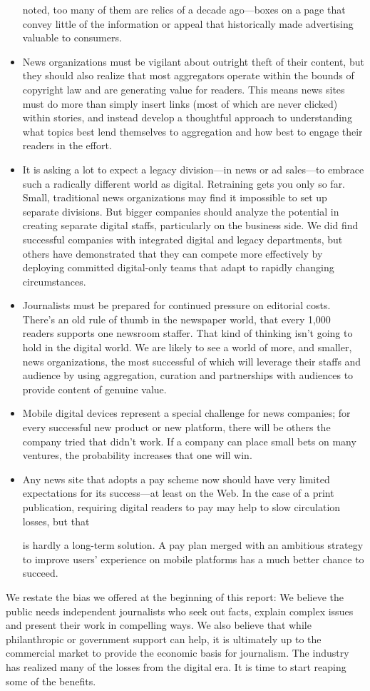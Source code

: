 \begin{itemize}
noted, too many of them are relics of a decade ago—boxes on a page that
convey little of the information or appeal that historically made advertising
valuable to consumers.
\item News organizations must be vigilant about outright theft of their content,
but they should also realize that most aggregators operate within the bounds
of copyright law and are generating value for readers. This means news sites
must do more than simply insert links (most of which are never clicked)
within stories, and instead develop a thoughtful approach to understanding
what topics best lend themselves to aggregation and how best to engage
their readers in the effort.
\item It is asking a lot to expect a legacy division—in news or ad sales—to embrace
such a radically different world as digital. Retraining gets you only so
far. Small, traditional news organizations may find it impossible to set up separate
divisions. But bigger companies should analyze the potential in creating
separate digital staffs, particularly on the business side. We did find successful
companies with integrated digital and legacy departments, but others have
demonstrated that they can compete more effectively by deploying committed
digital-only teams that adapt to rapidly changing circumstances.
\item Journalists must be prepared for continued pressure on editorial costs. There’s
an old rule of thumb in the newspaper world, that every 1,000 readers supports
one newsroom staffer. That kind of thinking isn’t going to hold in the
digital world. We are likely to see a world of more, and smaller, news organizations,
the most successful of which will leverage their staffs and audience
by using aggregation, curation and partnerships with audiences to provide
content of genuine value.
\item Mobile digital devices represent a special challenge for news companies; for
every successful new product or new platform, there will be others the company
tried that didn’t work. If a company can place small bets on many ventures,
the probability increases that one will win.
\item Any news site that adopts a pay scheme now should have very limited expectations
for its success—at least on the Web. In the case of a print publication,
requiring digital readers to pay may help to slow circulation losses, but that

is hardly a long-term solution. A pay plan merged with an ambitious strategy
to improve users’ experience on mobile platforms has a much better chance
to succeed.
\end{itemize}
We restate the bias we offered at the beginning of this report: We believe
the public needs independent journalists who seek out facts, explain complex
issues and present their work in compelling ways. We also believe that while
philanthropic or government support can help, it is ultimately up to the commercial
market to provide the economic basis for journalism. The industry has
realized many of the losses from the digital era. It is time to start reaping some
of the benefits.

